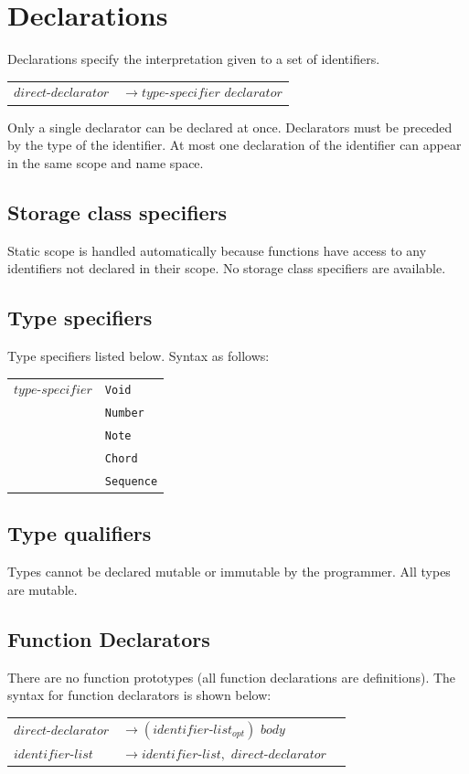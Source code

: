 \documentclass[12pt,A4]{book}
\begin{document}
\section{Declarations}
Declarations specify the interpretation given to a set of identifiers.

\begin{tabular}{l l}
$direct\mbox{-}declarator$ & $\rightarrow type\mbox{-}specifier$ $declarator$
\end{tabular}

Only a single declarator can be declared at once.  Declarators must be preceded by the type of the identifier.  At most one declaration of the identifier can appear in the same scope and name space.  
\subsection{Storage class specifiers}
Static scope is handled automatically because functions have access to any identifiers not declared in their scope. No storage class specifiers are available.
\subsection{Type specifiers}
Type specifiers listed below.  Syntax as follows:

\begin{tabular}{l l}
$type\mbox{-}specifier$  & \verb|Void| \\
& \verb|Number|\\
& \verb|Note|\\
& \verb|Chord|\\
& \verb|Sequence|
\end{tabular}

\subsection{Type qualifiers}
Types cannot be declared mutable or immutable by the programmer.  All types are mutable.
\subsection{Function Declarators}
There are no function prototypes (all function declarations are definitions).  The syntax for function declarators is shown below:

\begin{tabular}{l l l}
$direct\mbox{-}declarator $ & $\rightarrow (identifier\mbox{-}list_{opt})$ { $body$ } \\
$identifier\mbox{-}list$  & $\rightarrow identifier\mbox{-}list,$ $direct\mbox{-}declarator$
\end{tabular}
\end{document}
